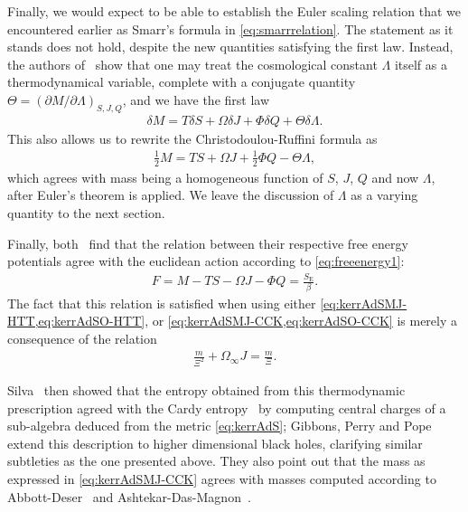 \documentclass[
twoside,
openright,
frontopenright
]{dmathesis}
\begin{document}
Finally, we would expect to be able to establish the Euler scaling relation that
we encountered earlier as Smarr's formula in \cref{eq:smarrrelation}. The
statement as it stands does not hold, despite the new quantities satisfying the
first law. Instead, the authors of~\cite{Caldarelli:1999xj} show that one may
treat the cosmological constant $\Lambda$ itself as a thermodynamical variable,
complete with a conjugate quantity
$\Theta = (\partial M/ \partial \Lambda)_{S,J,Q}$, and we have the first law
\begin{align}
  \delta M = T\delta S + \Omega \delta J + \Phi \delta Q + \Theta \delta \Lambda.
\end{align}
This also allows us to rewrite the Christodoulou-Ruffini formula as
\begin{align}
  \label{eq:smarrAdS1}
  \frac12 M= TS + \Omega J + \frac12 \Phi Q - \Theta \Lambda,
\end{align}
which agrees with mass being a homogeneous function of $S$, $J$, $Q$ and now
$\Lambda$, after Euler's theorem is applied. We leave the discussion of
$\Lambda$ as a varying quantity to the next section.

Finally, both~\cite{Hawking:1998kw,Caldarelli:1999xj} find that the relation
between their respective free energy potentials agree with the euclidean action
according to \cref{eq:freeenergy1}:
\begin{align}
  F = M- TS - \Omega J-\Phi Q = \frac{S_\mathrm{E}}{\beta}.
\end{align}
The fact that this relation is satisfied when using either
\cref{eq:kerrAdSMJ-HTT,eq:kerrAdSO-HTT}, or
\cref{eq:kerrAdSMJ-CCK,eq:kerrAdSO-CCK} is merely a consequence of the relation
\begin{align*}
  \frac{m}{\Xi^2}+\Omega_\infty J = \frac{m}{\Xi}.
\end{align*}

Silva~\cite{Silva:2002jq} then showed that the entropy obtained from this
thermodynamic prescription agreed with the Cardy
entropy~\cite{Cardy:1986ie,Bloete:1986qm} by computing central charges of a
sub-algebra deduced from the metric \cref{eq:kerrAdS}; Gibbons, Perry and
Pope~\cite{Gibbons:2004ai} extend this description to higher dimensional black
holes, clarifying similar subtleties as the one presented above. They also point
out that the mass as expressed in \cref{eq:kerrAdSMJ-CCK} agrees with masses
computed according to Abbott-Deser~\cite{Abbott:1981ff} and
Ashtekar-Das-Magnon~\cite{Ashtekar:1984zz,Ashtekar:1999jx}.
\end{document}

